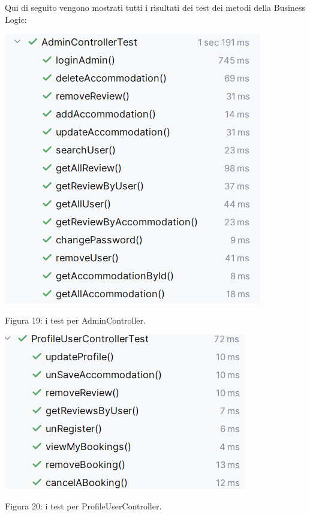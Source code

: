 \documentclass[10pt]{article}
\begin{document}
Qui di seguito vengono mostrati tutti i risultati dei test dei metodi della Business Logic:
\par\medskip
\begin{center}
\includegraphics[scale=0.55]{test/BusinessLogic/testAdminController}
\par\medskip
Figura 19: i test per AdminController.
\par\medskip
\end{center}
\begin{center}
\includegraphics[scale=0.55]{test/BusinessLogic/testProfileUserController}
\par\medskip
Figura 20: i test per ProfileUserController.
\par\medskip
\end{center}
\end{document}
